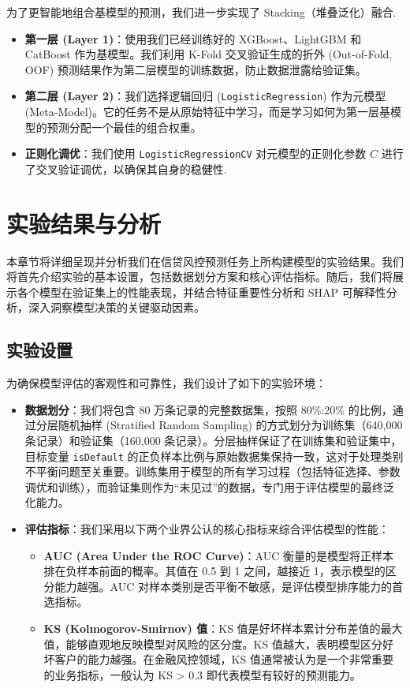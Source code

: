 \documentclass{thuemp}
\begin{document}
为了更智能地组合基模型的预测，我们进一步实现了 Stacking（堆叠泛化）融合.

\begin{itemize}
    \item \textbf{第一层 (Layer 1)}：使用我们已经训练好的 XGBoost、LightGBM 和 CatBoost 作为基模型。我们利用 K-Fold 交叉验证生成的折外 (Out-of-Fold, OOF) 预测结果作为第二层模型的训练数据，防止数据泄露给验证集。
    \item \textbf{第二层 (Layer 2)}：我们选择逻辑回归 (\texttt{LogisticRegression}) 作为元模型 (Meta-Model)。它的任务不是从原始特征中学习，而是学习如何为第一层基模型的预测分配一个最佳的组合权重。
    \item \textbf{正则化调优}：我们使用 \texttt{LogisticRegressionCV} 对元模型的正则化参数 $C$ 进行了交叉验证调优，以确保其自身的稳健性.
\end{itemize}


\section{实验结果与分析}
\label{sec:results}

本章节将详细呈现并分析我们在信贷风控预测任务上所构建模型的实验结果。我们将首先介绍实验的基本设置，包括数据划分方案和核心评估指标。随后，我们将展示各个模型在验证集上的性能表现，并结合特征重要性分析和 SHAP 可解释性分析，深入洞察模型决策的关键驱动因素。

\subsection{实验设置}

为确保模型评估的客观性和可靠性，我们设计了如下的实验环境：

\begin{itemize}
    \item \textbf{数据划分}：我们将包含 80 万条记录的完整数据集，按照 80\%:20\% 的比例，通过分层随机抽样 (Stratified Random Sampling) 的方式划分为训练集（640,000 条记录）和验证集（160,000 条记录）。分层抽样保证了在训练集和验证集中，目标变量 \texttt{isDefault} 的正负样本比例与原始数据集保持一致，这对于处理类别不平衡问题至关重要。训练集用于模型的所有学习过程（包括特征选择、参数调优和训练），而验证集则作为“未见过”的数据，专门用于评估模型的最终泛化能力。
    \item \textbf{评估指标}：我们采用以下两个业界公认的核心指标来综合评估模型的性能：
    \begin{itemize}
        \item \textbf{AUC (Area Under the ROC Curve)}：AUC 衡量的是模型将正样本排在负样本前面的概率。其值在 0.5 到 1 之间，越接近 1，表示模型的区分能力越强。AUC 对样本类别是否平衡不敏感，是评估模型排序能力的首选指标。
        \item \textbf{KS (Kolmogorov-Smirnov) 值}：KS 值是好坏样本累计分布差值的最大值，能够直观地反映模型对风险的区分度。KS 值越大，表明模型区分好坏客户的能力越强。在金融风控领域，KS 值通常被认为是一个非常重要的业务指标，一般认为 KS > 0.3 即代表模型有较好的预测能力。
    \end{itemize}
\end{itemize}
\end{document}
